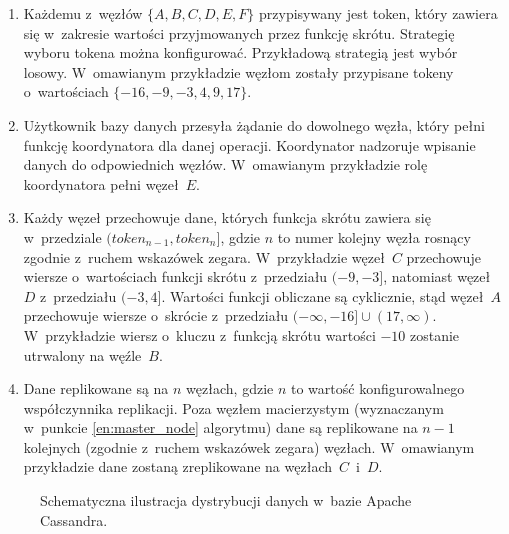 \begin{enumerate}
	\item Każdemu z~węzłów $\{A, B, C, D, E, F\}$ przypisywany jest token, który zawiera się w~zakresie wartości przyjmowanych przez funkcję skrótu. Strategię wyboru tokena można konfigurować. Przykładową strategią jest wybór losowy. W~omawianym przykładzie węzłom zostały przypisane tokeny o~wartościach $\{-16, -9, -3, 4, 9, 17\}$.
	\item Użytkownik bazy danych przesyła żądanie do dowolnego węzła, który pełni funkcję koordynatora dla danej operacji. Koordynator nadzoruje wpisanie danych do odpowiednich węzłów. W~omawianym przykładzie rolę koordynatora pełni węzeł~$E$.
	\item \label{en:master_node} Każdy węzeł przechowuje dane, których funkcja skrótu zawiera się w~przedziale $(token_{n-1}, token_{n}]$, gdzie $n$ to numer kolejny węzła rosnący zgodnie z~ruchem wskazówek zegara. W~przykładzie węzeł~$C$ przechowuje wiersze o~wartościach funkcji skrótu z~przedziału $(-9, -3]$, natomiast węzeł~$D$ z~przedziału $(-3, 4]$. Wartości funkcji obliczane są cyklicznie, stąd węzeł~$A$ przechowuje wiersze o~skrócie z~przedziału $(-\infty, -16] \cup (17, \infty)$. W~przykładzie wiersz o~kluczu z~funkcją skrótu wartości $-10$ zostanie utrwalony na węźle~$B$.
	\item Dane replikowane są na $n$ węzłach, gdzie $n$ to wartość konfigurowalnego współczynnika replikacji. Poza węzłem macierzystym (wyznaczanym w~punkcie \ref{en:master_node} algorytmu) dane są replikowane na $n - 1$ kolejnych (zgodnie z~ruchem wskazówek zegara) węzłach. W~omawianym przykładzie dane zostaną zreplikowane na węzłach~$C$~i~$D$.
\end{enumerate}

\begin{figure}[ht!]
	\centering
	

	\caption{Schematyczna ilustracja dystrybucji danych w~bazie Apache Cassandra.}
	\label{fig:data_distribution}
\end{figure}


